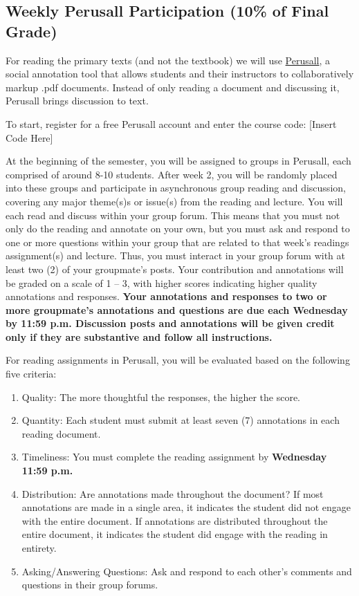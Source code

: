 \documentclass[11pt,]{article}
\providecommand{\tightlist}{%
  \setlength{\itemsep}{0pt}\setlength{\parskip}{0pt}}
\begin{document}
\hypertarget{perusall}{%
\subsection{Weekly Perusall Participation (10\% of Final
Grade)}\label{perusall}}

For reading the primary texts (and not the textbook) we will use
\href{https://support.perusall.com/hc/en-us}{Perusall}, a social
annotation tool that allows students and their instructors to
collaboratively markup .pdf documents. Instead of only reading a
document and discussing it, Perusall brings discussion to text.

To start, register for a free Perusall account and enter the course
code: {[}Insert Code Here{]}

At the beginning of the semester, you will be assigned to groups in
Perusall, each comprised of around 8-10 students. After week 2, you will
be randomly placed into these groups and participate in asynchronous
group reading and discussion, covering any major theme(s)s or issue(s)
from the reading and lecture. You will each read and discuss within your
group forum. This means that you must not only do the reading and
annotate on your own, but you must ask and respond to one or more
questions within your group that are related to that week's readings
assignment(s) and lecture. Thus, you must interact in your group forum
with at least two (2) of your groupmate's posts. Your contribution and
annotations will be graded on a scale of 1 -- 3, with higher scores
indicating higher quality annotations and responses. \textbf{Your
annotations and responses to two or more groupmate's annotations and
questions are due each Wednesday by 11:59 p.m. Discussion posts and
annotations will be given credit only if they are substantive and follow
all instructions.}

For reading assignments in Perusall, you will be evaluated based on the
following five criteria:

\begin{enumerate}
\def\labelenumi{\arabic{enumi}.}
\tightlist
\item
  Quality: The more thoughtful the responses, the higher the score.
\item
  Quantity: Each student must submit at least seven (7) annotations in
  each reading document.
\item
  Timeliness: You must complete the reading assignment by
  \textbf{Wednesday 11:59 p.m.}
\item
  Distribution: Are annotations made throughout the document? If most
  annotations are made in a single area, it indicates the student did
  not engage with the entire document. If annotations are distributed
  throughout the entire document, it indicates the student did engage
  with the reading in entirety.
\item
  Asking/Answering Questions: Ask and respond to each other's comments
  and questions in their group forums.
\end{enumerate}
\end{document}
